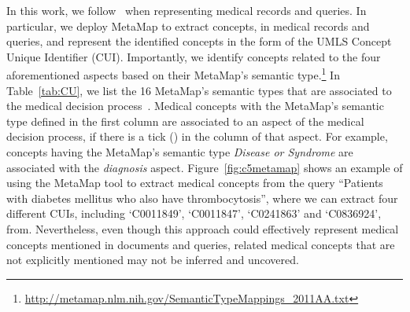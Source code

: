 \documentclass[1p]{elsarticle}
\newcommand{\tick}{\ding{52}}
\begin{document}
In this work, we follow~\cite{limsopatham2013oair} when representing medical records and queries. In particular, we deploy MetaMap to extract concepts, in medical records and queries, and represent the identified concepts in the form of the UMLS Concept Unique Identifier (CUI). Importantly, we identify concepts related to the four aforementioned aspects based on their MetaMap's semantic type.\footnote{\url{http://metamap.nlm.nih.gov/SemanticTypeMappings_2011AA.txt}} In Table~\ref{tab:CU}, we list the 16 MetaMap's semantic types that are associated to the medical decision process~\cite{limsopatham2013ecir-b}. Medical concepts with the MetaMap's semantic type defined in the first column are associated to an aspect of the medical decision process, if there is a tick (\tick) in the column of that aspect. For example, concepts having the MetaMap's semantic type \emph{Disease or Syndrome} are associated with the \emph{diagnosis} aspect.
Figure~\ref{fig:c5metamap} shows an example of using the MetaMap tool to extract medical concepts from the query ``Patients with diabetes mellitus who also have thrombocytosis'', where 
we can extract four different CUIs, including `C0011849', `C0011847', `C0241863' and `C0836924', from. Nevertheless, even though this approach could effectively represent medical concepts mentioned in documents and queries, related medical concepts that are not explicitly mentioned may not be inferred and uncovered.
\end{document}
